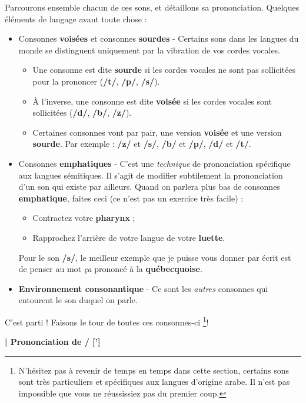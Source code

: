 Parcourons ensemble chacun de ces sons, et détaillons sa prononciation. Quelques éléments de langage avant toute chose :
\begin{itemize}
    \item Consonnes \textbf{voisées} et consonnes \textbf{sourdes} - Certains sons dans les langues du monde se distinguent uniquement par la vibration de vos cordes vocales. 
    \begin{itemize}
        \item Une consonne est dite \textbf{sourde} si les cordes vocales ne sont pas sollicitées pour la prononcer (\textbf{/t/}, \textbf{/p/}, \textbf{/s/}).
        \item À l'inverse, une consonne est dite \textbf{voisée} si les cordes vocales sont sollicitées (\textbf{/d/}, \textbf{/b/}, \textbf{/z/}).
        \item Certaines consonnes vont par pair, une version \textbf{voisée} et une version \textbf{sourde}. Par exemple : \textbf{/z/} et \textbf{/s/}, \textbf{/b/} et \textbf{/p/}, \textbf{/d/} et \textbf{/t/}.
    \end{itemize}
    \item Consonnes \textbf{emphatiques} - C'est une \textit{technique} de prononciation spécifique aux langues sémitiques. Il s'agit de modifier subtilement la prononciation d'un son qui existe par ailleurs. Quand on parlera plus bas de consonnes \textbf{emphatique}, faites ceci (ce n'est pas un exercice très facile) :
    \begin{itemize}
        \item Contractez votre \textbf{pharynx} ; 
        \item Rapprochez l'arrière de votre langue de votre \textbf{luette}.
    \end{itemize}
    Pour le son \textbf{/s/}, le meilleur exemple que je puisse vous donner par écrit est de penser au mot \textit{ça} prononcé à la \textbf{québecquoise}.
    \item \textbf{Environnement consonantique} - Ce sont les \textit{autres} consonnes qui entourent le son duquel on parle.
\end{itemize}

C'est parti ! Faisons le tour de toutes ces consonnes-ci \footnote{N'hésitez pas à revenir de temps en temps dans cette section, certains sons sont très particuliers et spécifiques aux langues d'origine arabe. Il n'est pas impossible que vous ne réussissiez pas du premier coup.}!

\textbf{| Prononciation de  /  [']}

